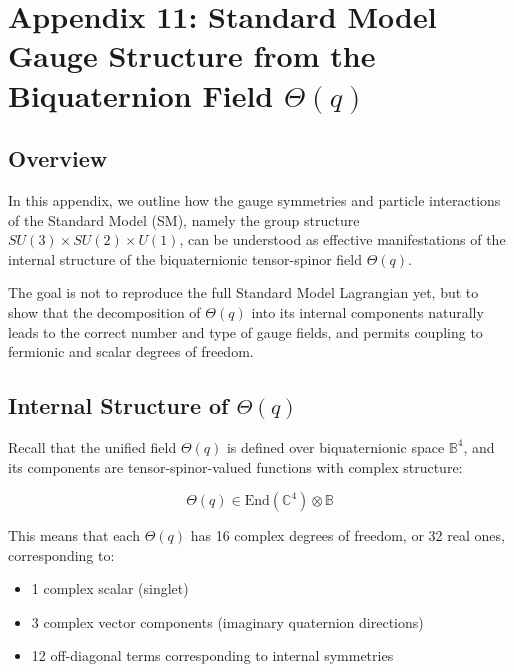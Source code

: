 

\section*{Appendix 11: Standard Model Gauge Structure from the Biquaternion Field \(\Theta(q)\)}

\subsection*{Overview}

In this appendix, we outline how the gauge symmetries and particle interactions of the Standard Model (SM),
namely the group structure \(SU(3) \times SU(2) \times U(1)\), can be understood as effective manifestations
of the internal structure of the biquaternionic tensor-spinor field \(\Theta(q)\).

The goal is not to reproduce the full Standard Model Lagrangian yet, but to show that the decomposition of 
\(\Theta(q)\) into its internal components naturally leads to the correct number and type of gauge fields, 
and permits coupling to fermionic and scalar degrees of freedom.

\subsection*{Internal Structure of \(\Theta(q)\)}

Recall that the unified field \(\Theta(q)\) is defined over biquaternionic space \(\mathbb{B}^4\), and its
components are tensor-spinor-valued functions with complex structure:

\[
\Theta(q) \in \text{End}(\mathbb{C}^4) \otimes \mathbb{B}
\]

This means that each \(\Theta(q)\) has 16 complex degrees of freedom, or 32 real ones, corresponding to:
\begin{itemize}
  \item 1 complex scalar (singlet)
  \item 3 complex vector components (imaginary quaternion directions)
  \item 12 off-diagonal terms corresponding to internal symmetries
\end{itemize}

